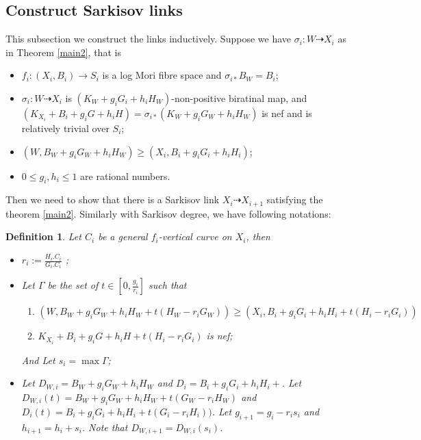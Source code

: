 \documentclass{article}
\newtheorem{defn}{Definition}[subsection]
\begin{document}
\subsection{Construct Sarkisov links}
This subsection we construct the links inductively. Suppose we have $\sigma_{i}:W\dashrightarrow X_{i}$ as in Theorem  \ref{main2}, that is 
\begin{itemize}
  \item $f_{i}:(X_{i},B_{i})\to S_{i}$ is a log Mori fibre space and $\sigma_{i*} B_{W}=B_{i}$;
  \item $\sigma_{i}:W\dashrightarrow  X_{i}$ is $(K_{W}+g_{i}G_{i}+h_{i}H_{W})$-non-positive biratinal map, and $(K_{X_{i}}+B_{i}+g_{i}G+h_{i}H)=\sigma_{i*}(K_{W}+g_{i}G_{W}+h_{i}H_{W})$ is nef and is relatively trivial over $S_{i}$;
  \item $(W,B_{W}+g_{i}G_{W}+h_{i}H_{W})\geqslant (X_{i},B_{i}+g_{i}G_{i}+h_{i}H_{i})$;
  \item $0\leqslant g_{i},h_{i}\leqslant 1$ are  rational numbers.
\end{itemize}
Then we need to show that there is a Sarkisov link $X_{i}\dashrightarrow X_{i+1}$ satisfying the theorem \ref{main2}. Similarly with Sarkisov degree, we have following notations:
\begin{defn}
  Let $C_{i}$ be a general $f_{i}$-vertical curve on $X_{i}$, then
  \begin{itemize}
    \item $r_{i}:=\frac{H_{i}.C_{i}}{G_{i}.C_{i}}$ ;
    \item Let $\Gamma$ be the set of $t\in [0,\frac{g_{i}}{r_{i}}] $ such that 
      \begin{enumerate}
        \item\label{nefcondition} $\left(W,B_{W}+g_{i}G_{W}+h_{i}H_{W}+t(H_{W}-r_{i}G_{W})\right)\geqslant \left(X_{i},B_{i}+g_{i}G_{i}+h_{i}H_{i}+t\left(H_{i}-r_{i}G_{i}\right)\right)$
        \item\label{singularcondition} $K_{X_{i}}+B_{i}+g_{i}G+h_{i}H+t(H_{i}-r_{i}G_{i})$ is nef;
    \end{enumerate}
    And Let $s_{i}=\max \Gamma $;
\item Let $D_{W,i}=B_{W}+g_{i}G_{W}+h_{i}H_{W}$ and $D_{i}=B_{i}+g_{i}G_{i}+h_{i}H_{i}+$. Let $D_{W,i}(t)=B_{W}+g_{i}G_{W}+h_{i}H_{W}+t(G_{W}-r_{i}H_{W})$ and $D_{i}(t)=B_{i}+g_{i}G_{i}+h_{i}H_{i}+t\left(G_{i}-r_{i}H_{i}\right))$. Let $g_{i+1}=g_{i}-r_{i}s_{i}$ and $h_{i+1}=h_{i}+s_{i}$. Note that $D_{W,i+1}=D_{W,i}(s_{i})$. 
  \end{itemize}
\end{defn}
\end{document}
